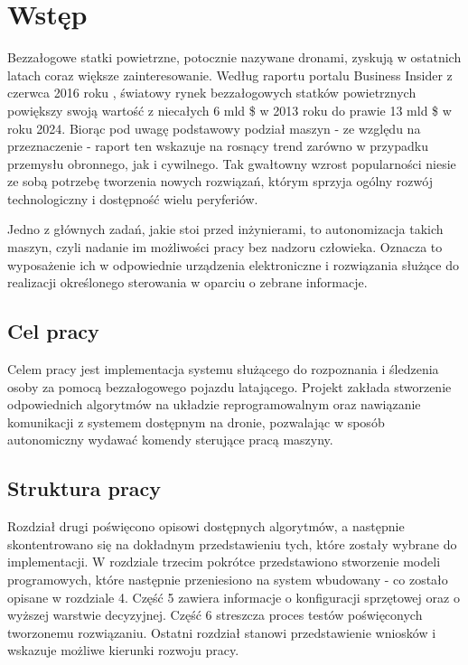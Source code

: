 \chapter{Wstęp}
\label{cha:wstep}

Bezzałogowe statki powietrzne, potocznie nazywane dronami, zyskują w ostatnich latach coraz większe zainteresowanie. Według raportu portalu Business Insider z czerwca 2016 roku \cite{BInsider}, światowy rynek bezzałogowych statków powietrznych powiększy swoją wartość z niecałych 6 mld \$ w 2013 roku do prawie 13 mld \$ w roku 2024. Biorąc pod uwagę podstawowy podział maszyn - ze względu na przeznaczenie - raport ten wskazuje na rosnący trend zarówno w przypadku przemysłu obronnego, jak i cywilnego. Tak gwałtowny wzrost popularności niesie ze sobą potrzebę tworzenia nowych rozwiązań, którym sprzyja ogólny rozwój technologiczny i dostępność wielu peryferiów. 

Jedno z głównych zadań, jakie stoi przed inżynierami, to autonomizacja takich maszyn, czyli nadanie im możliwości pracy bez nadzoru człowieka. Oznacza to wyposażenie ich w odpowiednie urządzenia elektroniczne i rozwiązania służące do realizacji określonego sterowania w oparciu o zebrane informacje.

\section{Cel pracy}

Celem pracy jest implementacja systemu służącego do rozpoznania i śledzenia osoby za pomocą bezzałogowego pojazdu latającego.  Projekt zakłada stworzenie odpowiednich algorytmów na układzie reprogramowalnym oraz nawiązanie komunikacji z systemem dostępnym na dronie, pozwalając w sposób autonomiczny wydawać komendy sterujące pracą maszyny.



\section{Struktura pracy}

Rozdział drugi poświęcono opisowi dostępnych algorytmów, a następnie skontentrowano się na dokładnym przedstawieniu tych, które zostały wybrane do implementacji. W rozdziale trzecim pokrótce przedstawiono stworzenie modeli programowych, które następnie przeniesiono na system wbudowany - co zostało opisane w rozdziale 4. Część 5 zawiera informacje o konfiguracji sprzętowej oraz o wyższej warstwie decyzyjnej. Część 6 streszcza proces testów poświęconych tworzonemu rozwiązaniu. Ostatni rozdział stanowi przedstawienie wniosków i wskazuje możliwe kierunki rozwoju pracy.












